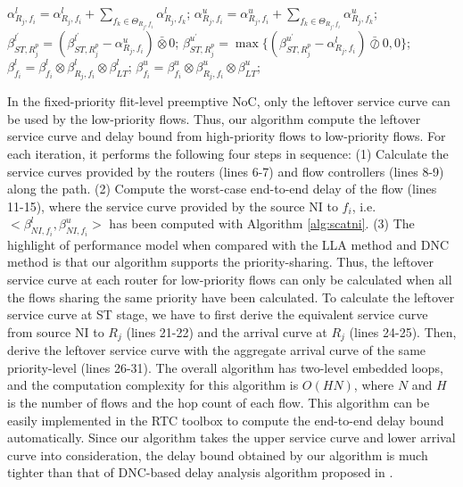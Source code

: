 \documentclass[preprint]{elsarticle}
\begin{document}
\begin{algorithm}
\begin{algorithmic}[1]
                    \State $\alpha^l_{R_j,f_i}=\alpha^l_{R_j,f_i}+\sum_{f_k\in\Theta_{R_j,f_i}}\alpha^l_{R_j,f_k}$;
                    \State $\alpha^u_{R_j,f_i}=\alpha^u_{R_j,f_i}+\sum_{f_k\in\Theta_{R_j,f_i}}\alpha^u_{R_j,f_k}$;
                    \State $\beta^{l^\prime}_{ST,R_j^{p}}=(\beta^{l^\prime}_{ST,R_j^{p}}-\alpha^u_{R_j,f_i})\bar{\otimes}0$;
                    \State $\beta^{u^\prime}_{ST,R_j^{p}}=\max\{(\beta^{u^\prime}_{ST,R_j^{p}}-\alpha^l_{R_j,f_i})\bar{\oslash}0,0\}$;
                \EndIf
            \EndIf
            \State $\beta_{f_i}^l=\beta_{f_i}^l\otimes\beta^l_{R_j,f_i}\otimes\beta^l_{LT}$;
            \State $\beta_{f_i}^u=\beta_{f_i}^u\otimes\beta^u_{R_j,f_i}\otimes\beta^u_{LT}$;
        \EndFor
    \EndFor
\end{algorithmic}
\end{algorithm}

In the fixed-priority flit-level preemptive NoC, only the leftover service curve can be used by the low-priority flows. Thus, our algorithm compute the leftover service curve and delay bound from high-priority flows to low-priority flows. For each iteration, it performs the following four steps in sequence: (1) Calculate the service curves provided by the routers (lines 6-7) and flow controllers (lines 8-9) along the path. (2) Compute the worst-case end-to-end delay of the flow (lines 11-15), where the service curve provided by the source NI to $f_i$, i.e. $<\beta_{NI,f_i}^l,\beta_{NI,f_i}^u>$ has been computed with Algorithm \ref{alg:scatni}. (3) The highlight of performance model when compared with the LLA method \cite{73} and DNC method \cite{Qian489900} is that our algorithm supports the priority-sharing. Thus, the leftover service curve at each router for low-priority flows can only be calculated when all the flows sharing the same priority have been calculated. To calculate the leftover service curve at ST stage, we have to first derive the equivalent service curve from source NI to $R_j$ (lines 21-22) and the arrival curve at $R_j$ (lines 24-25). Then, derive the leftover service curve with the aggregate arrival curve of the same priority-level (lines 26-31). The overall algorithm has two-level embedded loops, and the computation complexity for this algorithm is $O(HN)$, where $N$ and $H$ is the number of flows and the hop count of each flow. This algorithm can be easily implemented in the RTC toolbox \cite{rtc} to compute the end-to-end delay bound automatically. Since our algorithm takes the upper service curve and lower arrival curve into consideration, the delay bound obtained by our algorithm is much tighter than that of DNC-based delay analysis algorithm proposed in \cite{Qian489900}.
\end{document}
